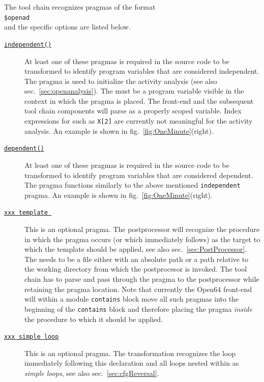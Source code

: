 \documentclass{book}
\newcommand{\refsec}[1]{{sec.~\ref{#1}}}
\newcommand{\reffig}[1]{{fig.~\ref{#1}}}
\begin{document}
The tool chain recognizes pragmas of the format\\[1ex]
\hspace*{.3cm}\lstinline{$openad }{\tt\em <pragma argument>}\\[1ex] %
and the specific {\tt\em <pragma argument>} options are listed below.  
\begin{description} 
\item[\underline{\tt independent({\em <variable name>})}] 
At least one of these pragmas is required in the source 
code to be transformed to identify program variables that are considered independent. 
The pragma is used to initialize the activity analysis (see also \refsec{sec:openanalysis}).
The {\em <variable name>} must be a program variable visible in the context in which the pragma is placed.
The front-end and the subsequent tool chain components will parse {\em <variable name>} as a properly 
scoped variable. Index expressions for {\em <variable name>} such as \lstinline{X[2]} are currently not meaningful
for the activity analysis. 
An example is shown in \reffig{fig:OneMinute}(right).
\item[\underline{\tt dependent({\em <variable name>})}] 
At least one of these pragmas is required in the source 
code to be transformed to identify program variables that are considered dependent.
The pragma functions similarly to the above mentioned \lstinline{independent} pragma. 
An example is shown in \reffig{fig:OneMinute}(right).
\item[\underline{\tt xxx template {\em <template file>}}] 
This is an optional pragma.
The postprocessor will recognize 
the procedure in which the pragma occurs (or which immediately follows) as the target to which 
the template should be applied, see also \refsec{sec:PostProcessor}.
The {\em <template file>} needs to be a file either with an absolute path or a 
path relative to the working directory from which the postprocesor is invoked. 
The tool chain has to  parse and pass through the pragma to the postprocessor while retaining the pragma location.
Note that currently the Open64 front-end will within a module \lstinline{contains} block move all such pragmas into the 
beginning of the \lstinline{contains} block and therefore placing the pragma {\em inside} the procedure 
to which it should be applied.
\item[\underline{\tt xxx simple loop}]
This is an optional pragma. 
The transformation recognizes the loop immediately following this declaration and all 
loops nested within as {\em simple loops}, see also \refsec{sec:cfgReversal}.
\end{description}
\end{document}
